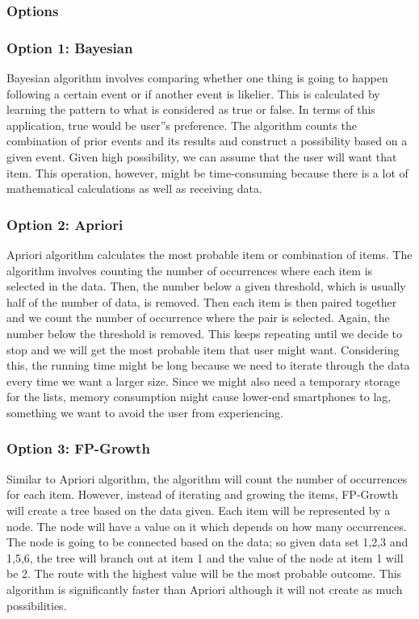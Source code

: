 \documentclass[journal,compsoc, 10pt, draftclsnofoot, onecolumn]{IEEEtran}
\begin{document}
\subsubsection{Options}
\subsubsection*{Option 1: Bayesian}
Bayesian algorithm involves comparing whether one thing is going to happen following a certain event or if another event is likelier. This is calculated by learning the pattern to what is considered as true or false. In terms of this application, true would be user''s preference. The algorithm counts the combination of prior events and its results and construct a possibility based on a given event. Given high possibility, we can assume that the user will want that item. This operation, however, might be time-consuming because there is a lot of mathematical calculations as well as receiving data.

\subsubsection*{Option 2: Apriori}
Apriori algorithm calculates the most probable item or combination of items. The algorithm involves counting the number of occurrences where each item is selected in the data. Then, the number below a given threshold, which is usually half of the number of data, is removed. Then each item is then paired together and we count the number of occurrence where the pair is selected. Again, the number below the threshold is removed. This keeps repeating until we decide to stop and we will get the most probable item that user might want. Considering this, the running time might be long because we need to iterate through the data every time we want a larger size. Since we might also need a temporary storage for the lists, memory consumption might cause lower-end smartphones to lag, something we want to avoid the user from experiencing.

\subsubsection*{Option 3: FP-Growth}
Similar to Apriori algorithm, the algorithm will count the number of occurrences for each item. However, instead of iterating and growing the items, FP-Growth will create a tree based on the data given. Each item will be represented by a node. The node will have a value on it which depends on how many occurrences. The node is going to be connected based on the data; so given data set {1,2,3} and {1,5,6}, the tree will branch out at item 1 and the value of the node at item 1 will be 2. The route with the highest value will be the most probable outcome. This algorithm is significantly faster than Apriori although it will not create as much possibilities. 
\end{document}
